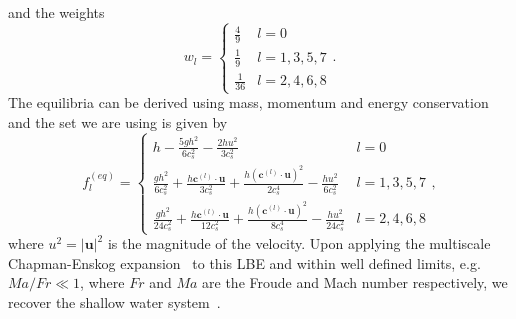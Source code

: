 \documentclass[twoside,twocolumn,9pt]{article}
\begin{document}
and the weights
\begin{equation}\label{eq:weights}
    w_l  =
    \left\{
    \begin{array}{ll}
        \frac{4}{9} & l = 0 \\
        \frac{1}{9} &  l=1,3,5,7 \\
        \frac{1}{36} & l=2,4,6,8
    \end{array}
    \right..
\end{equation}
The equilibria can be derived using mass, momentum and energy conservation and the set we are using is given by~\cite{salmonLatticeBoltzmannMethod1999, dellarNonhydrodynamicModesPriori2002}  
\begin{equation} \label{eq:equilibria}
f_l^{(eq)}  =
\left\{
\begin{array}{ll}
h - \frac{5gh^2}{6c_s^2} - \frac{2hu^2}{3c_s^2}& l = 0 \\
\frac{gh^2}{6c_s^2} + \frac{h \mathbf{c}^{(l)}\cdot \mathbf{u}}{3 c_s^2} + \frac{h(\mathbf{c}^{(l)}\cdot \mathbf{u})^2}{2 c_s^4}-\frac{hu^2}{6c_s^2} &  l=1,3,5,7 \\
\frac{gh^2}{24c_s^2} + \frac{h \mathbf{c}^{(l)}\cdot\mathbf{u}}{12 c_s^2} + \frac{h (\mathbf{c}^{(l)}\cdot\mathbf{u})^2}{8c_s^4}-\frac{hu^2}{24c_s^2} & l=2,4,6,8
\end{array}
\right.,
\end{equation}
where $u^2 = |\mathbf{u}|^2$ is the magnitude of the velocity.
Upon applying the multiscale Chapman-Enskog expansion~\cite{enskogKinetischeTheorieVorgange1917, chapmanMathematicalTheoryNonuniform1990, krugerLatticeBoltzmannMethod2017} to this LBE and within well defined limits, e.g. $Ma/Fr \ll 1$, where $Fr$ and $Ma$ are the Froude and Mach number respectively, we recover the shallow water system~\cite{salmonLatticeBoltzmannMethod1999, zitzLatticeBoltzmannMethod2019}.
\end{document}
